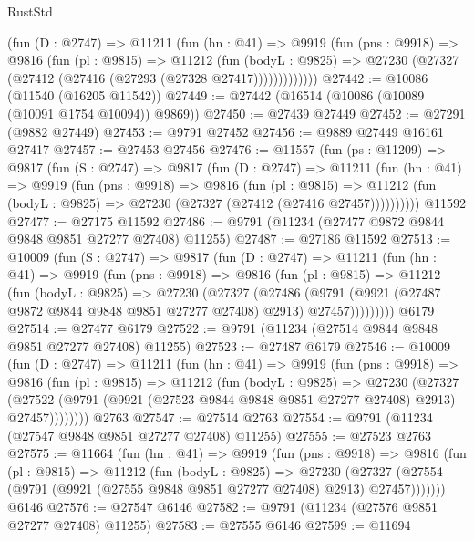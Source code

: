 \begin{lexlean}{RustStd}
\begin{coremodule}
          (fun (D : @2747) =>
          @11211
            (fun (hn : @41) =>
            @9919
              (fun (pns : @9918) =>
              @9816
                (fun (pl : @9815) =>
                @11212
                  (fun (bodyL : @9825) =>
                  @27230 (@27327 (@27412 (@27416 (@27293 (@27328 @27417)))))))))))))
@27442 := @10086 (@11540 (@16205 @11542))
@27449 := @27442 (@16514 (@10086 (@10089 (@10091 @1754 @10094)) @9869))
@27450 := @27439 @27449
@27452 := @27291 (@9882 @27449)
@27453 := @9791 @27452
@27456 := @9889 @27449 @16161 @27417
@27457 := @27453 @27456
@27476 := @11557
    (fun (ps : @11209) =>
    @9817
      (fun (S : @2747) =>
      @9817
        (fun (D : @2747) =>
        @11211
          (fun (hn : @41) =>
          @9919
            (fun (pns : @9918) =>
            @9816
              (fun (pl : @9815) =>
              @11212 (fun (bodyL : @9825) => @27230 (@27327 (@27412 (@27416 @27457))))))))))
    @11592
@27477 := @27175 @11592
@27486 := @9791 (@11234 (@27477 @9872 @9844 @9848 @9851 @27277 @27408) @11255)
@27487 := @27186 @11592
@27513 := @10009
    (fun (S : @2747) =>
    @9817
      (fun (D : @2747) =>
      @11211
        (fun (hn : @41) =>
        @9919
          (fun (pns : @9918) =>
          @9816
            (fun (pl : @9815) =>
            @11212
              (fun (bodyL : @9825) =>
              @27230
                (@27327
                  (@27486
                    (@9791
                      (@9921 (@27487 @9872 @9844 @9848 @9851 @27277 @27408) @2913)
                      @27457)))))))))
    @6179
@27514 := @27477 @6179
@27522 := @9791 (@11234 (@27514 @9844 @9848 @9851 @27277 @27408) @11255)
@27523 := @27487 @6179
@27546 := @10009
    (fun (D : @2747) =>
    @11211
      (fun (hn : @41) =>
      @9919
        (fun (pns : @9918) =>
        @9816
          (fun (pl : @9815) =>
          @11212
            (fun (bodyL : @9825) =>
            @27230
              (@27327
                (@27522 (@9791 (@9921 (@27523 @9844 @9848 @9851 @27277 @27408) @2913) @27457))))))))
    @2763
@27547 := @27514 @2763
@27554 := @9791 (@11234 (@27547 @9848 @9851 @27277 @27408) @11255)
@27555 := @27523 @2763
@27575 := @11664
    (fun (hn : @41) =>
    @9919
      (fun (pns : @9918) =>
      @9816
        (fun (pl : @9815) =>
        @11212
          (fun (bodyL : @9825) =>
          @27230
            (@27327 (@27554 (@9791 (@9921 (@27555 @9848 @9851 @27277 @27408) @2913) @27457)))))))
    @6146
@27576 := @27547 @6146
@27582 := @9791 (@11234 (@27576 @9851 @27277 @27408) @11255)
@27583 := @27555 @6146
@27599 := @11694

\end{coremodule}
\end{lexlean}
